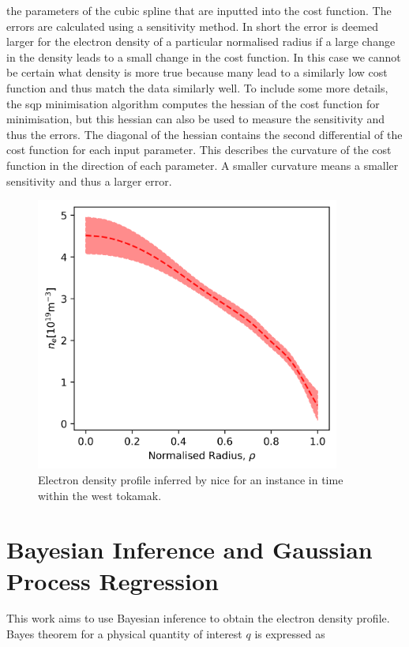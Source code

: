 the parameters of the cubic spline that are inputted into the cost function. The errors are calculated using a sensitivity method. In short the error is deemed larger for the electron density of a particular normalised radius if a large change in the density leads to a small change in the cost function. In this case we cannot be certain what density is more true because many lead to a similarly low cost function and thus match the data similarly well. To include some more details, the \gls{sqp} minimisation algorithm computes the hessian of the cost function for minimisation, but this hessian can also be used to measure the sensitivity and thus the errors. The diagonal of the hessian contains the second differential of the cost function for each input parameter. This describes the curvature of the cost function in the direction of each parameter. A smaller curvature means a smaller sensitivity and thus a larger error.

\begin{figure}
  \centering
  \includegraphics[width=10cm]{images/niceExample.png}
  \caption{Electron density profile inferred by \gls{nice} for an instance in time within the \gls{west} tokamak.}
  \label{fig:nice_example}
\end{figure}

\section{Bayesian Inference and Gaussian Process Regression}

This work aims to use Bayesian inference to obtain the electron density profile. Bayes theorem for a physical quantity of interest $q$ is expressed as 

